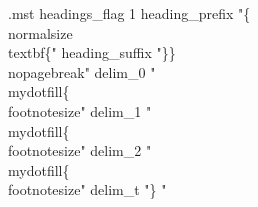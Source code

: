 \makeatletter
\renewenvironment{theindex}
{{\chapter{\indexname}\label{sec:app:index}}\par%
\@mkboth{\MakeUppercase\indexname}{\MakeUppercase\indexname}%
\parindent\z@
\parskip\z@ \@plus .5\p@\relax
\let\item\@idxitem
\setlength{\columnsep}{30pt}
\setlength{\parindent}{0em}
\let\item\@idxitem}
{\clearpage}
\renewcommand{\@idxitem}{\par\hangindent 15\p@}
\renewcommand{\subitem}{\par\hangindent 30\p@\hspace*{15pt}}
\makeatother

\begin{filecontents}{\jobname.mst}
headings_flag 1
heading_prefix "\{\\normalsize\\textbf\{"
heading_suffix "\}\}\\nopagebreak\n"
delim_0 "\\mydotfill\{\\footnotesize"
delim_1 "\\mydotfill\{\\footnotesize"
delim_2 "\\mydotfill\{\\footnotesize"
delim_t "\} "
\end{filecontents}

\renewcommand{\glsdescwidth}{12cm}

\makeatletter
\patchcmd{\@glossarysection}{%
    \@@glossaryseclabel%
}{%
    \@@glossaryseclabel%
    \label{\glsautoprefix\@glo@type}
}{}{}
\makeatother


